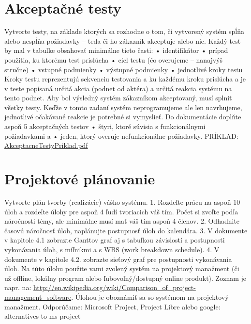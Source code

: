 
\section{Akceptačné testy}
Vytvorte testy, na základe ktorých sa rozhodne o tom, či vytvorený systém spĺňa alebo nespĺňa
požiadavky – teda či ho zákazník akceptuje alebo nie. Každý test by mal v tabuľke obsahovať minimálne
tieto časti:
• identifikátor
• prípad použitia, ku ktorému test prislúcha
• cieľ testu (čo overujeme – nanajvýš stručne)
• vstupné podmienky
• výstupné podmienky
• jednotlivé kroky testu
Kroky testu reprezentujú sekvenciu testovania a ku každému kroku prislúcha a je v teste popísaná určitá
akcia (podnet od aktéra) a určitá reakcia systému na tento podnet. Aby bol výsledný systém zákazníkom
akceptovaný, musí splniť všetky testy. Keďže v tomto zadaní systém neprogramujeme ale len
navrhujeme, jednotlivé očakávané reakcie je potrebné si vymyslieť.
Do dokumentácie doplňte aspoň 5 akceptačných testov
• štyri, ktoré súvisia s funkcionálnymi požiadavkami a
• jeden, ktorý overuje nefunkcionálne požiadavky.
PRÍKLAD: \href{https://uim.fei.stuba.sk/wp-content/uploads/2022/10/AkceptacneTestyPriklad.pdf}{AkceptacneTestyPriklad.pdf}


\section{Projektové plánovanie}
Vytvorte plán tvorby (realizácie) vášho systému.
1. Rozdeľte prácu na aspoň 10 úloh a rozdeľte úlohy pre aspoň 4 ľudí tvoriacich váš tím. Počet si zvoľte
podľa náročnosti témy, ale minimálne musí mať váš tím aspoň 4 členov.
2. Odhadnite časovú náročnosť úloh, naplánujte postupnosť úloh do kalendára.
3. V dokumente v kapitole 4.1 zobrazte Ganttov graf aj s tabuľkou závislostí a postupnosti vykonávania
úloh, s míľnikmi a s WBS (work breakdown schedule).
4. V dokumente v kapitole 4.2. zobrazte sieťový graf pre postupnosti vykonávania úloh.
Na túto úlohu použite vami zvolený systém na projektový manažment (či už offline, lokálny program
alebo ľubovoľný/dostupný online produkt). Zoznam je napr. na:
\url{http://en.wikipedia.org/wiki/Comparison_of_project-management_software}. Úlohou je oboznámiť sa
so systémom na projektový manažment.
Odporúčame: Microsoft Project, Project Libre alebo google: alternatives to ms project

